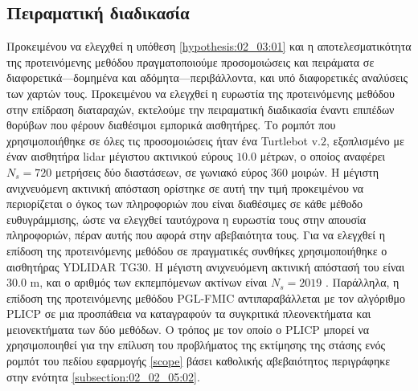\subsection{Πειραματική διαδικασία}
\label{subsection:02_03_04:01}

Προκειμένου να ελεγχθεί η υπόθεση \ref{hypothesis:02_03:01} και η
αποτελεσματικότητα της προτεινόμενης μεθόδου πραγματοποιούμε προσομοιώσεις και
πειράματα σε διαφορετικά---δομημένα και αδόμητα---περιβάλλοντα, και υπό
διαφορετικές αναλύσεις των χαρτών τους.  Προκειμένου να ελεγχθεί η ευρωστία της
προτεινόμενης μεθόδου στην επίδραση διαταραχών, εκτελούμε την πειραματική
διαδικασία έναντι επιπέδων θορύβων που φέρουν διαθέσιμοι εμπορικά αισθητήρες.
Το ρομπότ που χρησιμοποιήθηκε σε όλες τις προσομοιώσεις ήταν ένα Turtlebot
v.$2$, εξοπλισμένο με έναν αισθητήρα lidar μέγιστου ακτινικού εύρους $10.0$
μέτρων, ο οποίος αναφέρει $N_s=720$ μετρήσεις δύο διαστάσεων, σε γωνιακό εύρος
$360$ μοιρών. Η μέγιστη ανιχνευόμενη ακτινική απόσταση ορίστηκε σε αυτή την
τιμή προκειμένου να περιορίζεται ο όγκος των πληροφοριών που είναι διαθέσιμες
σε κάθε μέθοδο ευθυγράμμισης, ώστε να ελεγχθεί ταυτόχρονα η ευρωστία τους στην
απουσία πληροφοριών, πέραν αυτής που αφορά στην αβεβαιότητα τους. Για να
ελεγχθεί η επίδοση της προτεινόμενης μεθόδου σε πραγματικές συνθήκες
χρησιμοποιήθηκε ο αισθητήρας YDLIDAR TG30. Η μέγιστη ανιχνευόμενη ακτινική
απόστασή του είναι $30.0$ m, και ο αριθμός των εκπεμπόμενων ακτίνων είναι $N_s
= 2019$ \cite{ydlidar}. Παράλληλα, η επίδοση της προτεινόμενης μεθόδου PGL-FMIC
αντιπαραβάλλεται με τον αλγόριθμο PLICP σε μια προσπάθεια να καταγραφούν τα
συγκριτικά πλεονεκτήματα και μειονεκτήματα των δύο μεθόδων. Ο τρόπος με τον
οποίο ο PLICP μπορεί να χρησιμοποιηθεί για την επίλυση του προβλήματος της
εκτίμησης της στάσης ενός ρομπότ του πεδίου εφαρμογής \ref{scope} βάσει
καθολικής αβεβαιότητος περιγράφηκε στην ενότητα \ref{subsection:02_02_05:02}.



